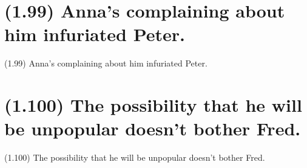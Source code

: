 \documentclass{article}
\begin{document}
\clearpage

%
%

\section*{(1.99) Anna's complaining about him infuriated Peter.}

\bigbreak
\begin{enumerate*}
\item[(1.99)] Anna's complaining about him infuriated Peter.
\end{enumerate*}
\bigbreak

\bigbreak
\begin{minipage}{\textwidth}
\end{minipage}
\bigbreak

\clearpage

%
%

\section*{(1.100) The possibility that he will be unpopular doesn’t bother Fred.}

\bigbreak
\begin{enumerate*}
\item[(1.100)] The possibility that he will be unpopular doesn’t bother Fred.
\end{enumerate*}
\bigbreak

\bigbreak
\begin{minipage}{\textwidth}
\end{minipage}
\bigbreak
\end{document}
